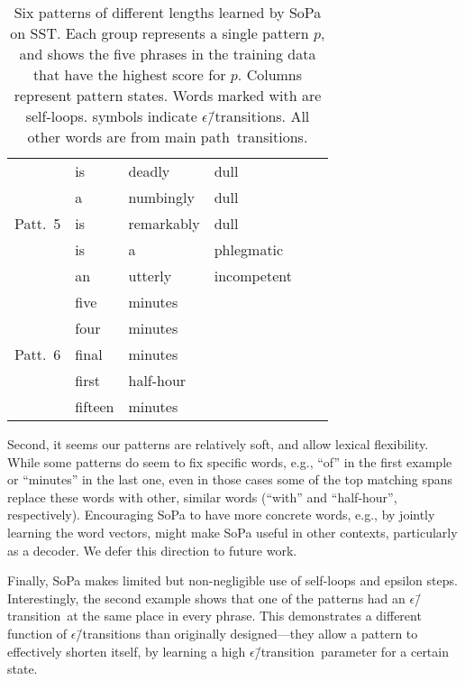 \documentclass[11pt,a4paper]{article}
\newcommand{\softp}{pattern\xspace}
\newcommand{\SoftP}{SoPa\xspace}
\newcommand{\happy}{main path\xspace}
\newcommand{\epstrans}{$\epsilon$\=/transition} %
\begin{document}
\begin{table}[t]
\begin{tabularx}{\linewidth}{c |lllll}
  \midrule

   \multirow{5}{*}{Patt.~5} & is &             deadly&          dull&& \\
 & a&               numbingly&       dull        &&   \\
&  is&             remarkably & dull&& \\
& is   &           a             &  phlegmatic&& \\
 & an   &           utterly&         incompetent&& \\

  \midrule

  \multirow{5}{*}{Patt.~6} & five & minutes&&& \\
  & four &minutes&&& \\
  &  final &          minutes&&& \\
  & first& half-hour&&& \\
    & fifteen&         minutes&&& \\

  \bottomrule
\end{tabularx}
\caption{\label{patt-interpretability}
Six patterns of different lengths learned by \SoftP on SST.
Each group represents a single pattern $p$, and shows the five phrases in
the training data that have the highest score for $p$.
Columns represent pattern states.
Words marked with \sloop{}are self-loops.
\ep{}symbols indicate \epstrans s.
All other words are from \happy\ transitions.}
\end{table}


Second, it seems our patterns are relatively soft, and  allow lexical flexibility. 
While some patterns do seem to fix specific words, e.g., ``of'' in the first example or ``minutes'' in the last one, 
even in those cases some of the top matching spans replace these words with other, similar words (``with'' and ``half-hour'', respectively).
Encouraging \SoftP to have more concrete words, e.g., by jointly learning the word vectors, might make \SoftP useful in other contexts, particularly as a decoder.
We defer this direction to future work.


Finally, \SoftP makes limited but non-negligible use of self-loops and epsilon steps.
Interestingly, the second example shows that one of the patterns had an \epstrans\ at the same place in every phrase.
This demonstrates a different function of \epstrans s than originally designed---they allow a \softp to 
effectively shorten itself, by learning a high \epstrans\ parameter for a certain state.
\end{document}
